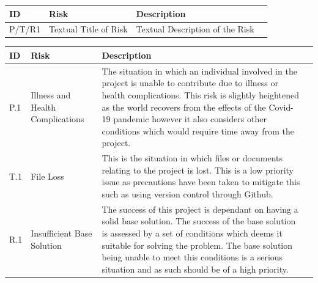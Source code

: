\documentclass[12pt]{article}  %
\theoremstyle{definition}
\theoremstyle{remark}
\begin{document}
\begin{tabularx}{1.1\textwidth} {
	|  >{\center\arraybackslash}X
	| >{\center\arraybackslash}X
	| >{\center\arraybackslash}X
	| >{\center\arraybackslash} X | }
	\hline
	ID & Risk & Description \\
	\hline
	P/T/R1 & Textual Title of Risk & Textual Description of the Risk \\
	\hline
\end{tabularx}

\begin{tabularx}{1.1\textwidth} {
	|  >{\center\arraybackslash}X
	| >{\center\arraybackslash}X
	| >{\center\arraybackslash}X
	| >{\center\arraybackslash} X | }
	\hline
	ID & Risk & Description \\
	\hline
	P.1 & Illness and Health Complications & The situation in which an individual involved in the project is unable to contribute due to illness or health complications. This risk is slightly heightened as the world recovers from the effects of the Covid-19 pandemic however it also considers other conditions which would require time away from the project. \\
	\hline
	T.1 & File Loss & This is the situation in which files or documents relating to the project is lost. This is a low priority issue as precautions have been taken to mitigate this such as using version control through Github. \\
	\hline
	R.1 & Insufficient Base Solution & The success of this project is dependant on having a solid base solution. The success of the base solution is assessed by a set of conditions which deems it suitable for solving the problem. The base solution being unable to meet this conditions is a serious situation and as such should be of a high priority. \\
	\hline
\end{tabularx}
\end{document}
